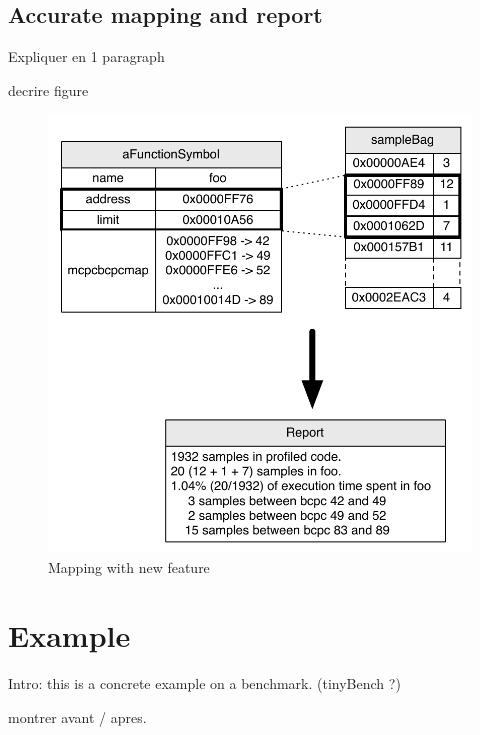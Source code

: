 \documentclass[10pt,preprint]{sigplanconf}
\newcommand{\figlabel}[1]{\label{fig:#1}}
\begin{document}
\subsection{Accurate mapping and report}


Expliquer en 1 paragraph

decrire figure

 \begin{figure}[!htp]
     \begin{center}
         \includegraphics[width=1.0\linewidth]{NewMapping}
         \caption{Mapping with new feature}
         \figlabel{fig:NewMapping}
     \end{center}
 \end{figure}
 

\section{Example}

Intro: this is a concrete example on a benchmark. (tinyBench ?)

montrer avant / apres.
\end{document}
